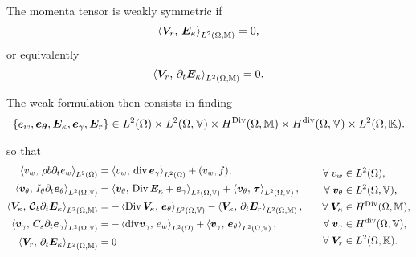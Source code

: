 The momenta tensor is weakly symmetric if 
$$\inner[L^2(\Omega, \mathbb{M})]{\bm{V}_r}{\bm{E}_{\kappa}} = 0,$$
or equivalently 
$$\inner[L^2(\Omega, \mathbb{M})]{\bm{V}_r}{\partial_t {\bm{E}}_{\kappa}} = 0.$$

The weak formulation then consists in finding 
\[
\{e_w, \bm{e}_{\bm{\theta}}, \bm{E}_{\kappa}, \bm{e}_{\gamma}, \bm{E}_{r}\} \in L^2(\Omega) \times L^2(\Omega, \mathbb{V}) \times H^{\Div}(\Omega, \mathbb{M}) \times H^{\div}(\Omega, \mathbb{V}) \times L^2(\Omega, \mathbb{K}).
\]



so that 
\begin{equation}
\label{eq:weak_min_div_weak}
\begin{aligned}
\inner[L^2(\Omega)]{v_w}{\rho b \partial_t {e}_w} &= \inner[L^2(\Omega)]{v_w}{\div \bm{e}_\gamma} + (v_w, f), \\ 
\inner[L^2(\Omega, \mathbb{V})]{\bm{v}_\theta}{I_\theta \partial_t {\bm{e}}_\theta} &= \inner[L^2(\Omega, \mathbb{V})]{\bm{v}_\theta}{\Div \bm{E}_\kappa + \bm{e}_\gamma} + \inner[L^2(\Omega, \mathbb{V})]{\bm{v}_\theta}{\bm{\tau}}, \\  
\inner[L^2(\Omega, \mathbb{M})]{\bm{V}_\kappa}{\bm{\mathcal{C}}_{b} \partial_t {\bm{E}}_\kappa} &= -\inner[L^2(\Omega, \mathbb{V})]{\Div \bm{V}_\kappa}{\bm{e}_\theta} -  \inner[L^2(\Omega, \mathbb{M})]{\bm{V}_\kappa}{\partial_t {\bm{E}}_r}, \\ 
\inner[L^2(\Omega, \mathbb{V})]{\bm{v}_\gamma}{C_s \partial_t {\bm{e}}_\gamma} &= -\inner[L^2(\Omega)]{\mathrm{div} \bm{v}_\gamma}{e_w} + \inner[L^2(\Omega, \mathbb{V})]{\bm{v}_\gamma}{\bm{e}_{\theta}}, \\   
\inner[L^2(\Omega, \mathbb{M})]{\bm{V}_r}{\partial_t {\bm{E}}_\kappa} &= 0
\end{aligned} \qquad
\begin{aligned}
\forall \;v_w &\in L^2(\Omega), \\
\forall \; \bm{v}_\theta &\in L^2(\Omega, \mathbb{V}), \\
\forall \;\bm{V}_\kappa &\in H^{\Div}(\Omega, \mathbb{M}), \\
\forall \;\bm{v}_\gamma &\in H^{\div}(\Omega, \mathbb{V}), \\
\forall \;\bm{V}_r &\in L^2(\Omega, \mathbb{K}).\\
\end{aligned}
\end{equation}

